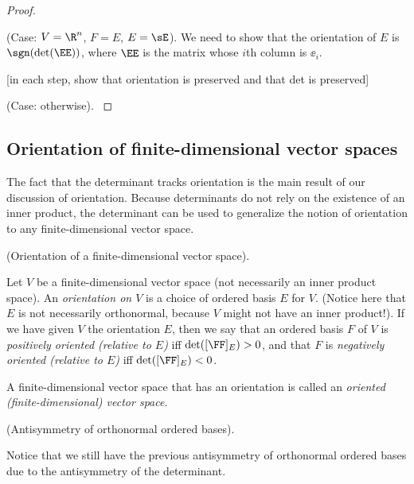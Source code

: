 \begin{proof} \mbox{} \\
    \fullindent
    {
        (Case: $V = \R^n$, $F = E$, $E = \sE$). We need to show that the orientation of $E$ is $\sgn(\det(\EE))$, where $\EE$ is the matrix whose $i$th column is $\ee_i$.

        [in each step, show that orientation is preserved and that det is preserved]
    }

    \fullindent
    {
        (Case: otherwise).
    }
\end{proof}

\subsection*{Orientation of finite-dimensional vector spaces}

\label{ch::lin_alg::orientation_finite_dim_vector_space}

The fact that the determinant tracks orientation is the main result of our discussion of orientation. Because determinants do not rely on the existence of an inner product, the determinant can be used to generalize the notion of orientation to any finite-dimensional vector space.

\begin{defn}
\label{ch::lin_alg::defn::orientation_finite_dim_vector_space}
    (Orientation of a finite-dimensional vector space).
    
    Let $V$ be a finite-dimensional vector space (not necessarily an inner product space). An \textit{orientation on $V$} is a choice of ordered basis $E$ for $V$. (Notice here that $E$ is not necessarily orthonormal, because $V$ might not have an inner product!). If we have given $V$ the orientation $E$, then we say that an ordered basis $F$ of $V$ is \textit{positively oriented (relative to $E$)} iff $\det([\FF]_E) > 0$, and that $F$ is \textit{negatively oriented (relative to $E$)} iff $\det([\FF]_E) < 0$.
    
    A finite-dimensional vector space that has an orientation is called an \textit{oriented (finite-dimensional) vector space}.
\end{defn}
 
\begin{remark}
    (Antisymmetry of orthonormal ordered bases).
    
    Notice that we still have the previous antisymmetry of orthonormal ordered bases due to the antisymmetry of the determinant.
\end{remark}

